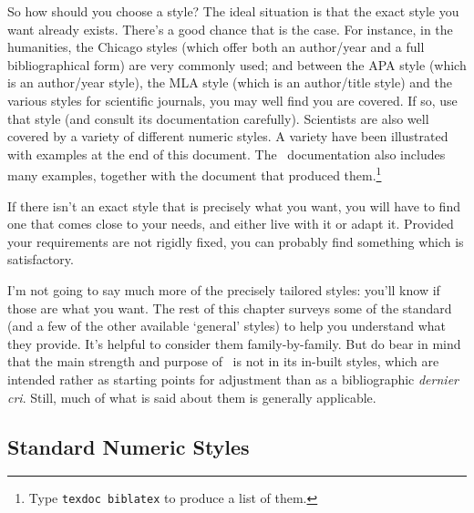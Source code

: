 So how should you choose a style? The ideal situation is that the
exact style you want already exists. There's a good chance that is the
case. For instance, in the humanities, the Chicago styles (which offer
both an author/year and a full bibliographical form) are very commonly
used; and between the APA style (which is an author/year style), the MLA style (which is an author/title style) and
the various styles for scientific journals, you may well find you are
covered. If so, use that style (and consult its documentation
carefully). Scientists are also well covered by a variety of different numeric styles. A variety have been illustrated with examples at the end of this document. The \biblatex\ documentation also includes many examples, together with the document that produced them.\footnote[][-2ex]{Type \texttt{texdoc biblatex} to produce a list of them.}

If there isn't an exact style that is precisely what you want, you will have to find one that comes
close to your needs, and either live with it or adapt it. Provided your requirements are not rigidly fixed, you can probably
find something which is satisfactory.

I'm not going to say much more of the precisely tailored styles:
you'll know if those are what you want. The rest of this chapter
surveys some of the standard (and a few of the other available
`general' styles) to help you understand what they provide. It's
helpful to consider them family-by-family. But do bear in mind that
the main strength and purpose of \biblatex\ is not in its in-built
styles, which are intended rather as starting points for adjustment
than as a bibliographic \emph{dernier cri}. Still, much of what is said about them is generally applicable.

\subsection{Standard Numeric Styles}

